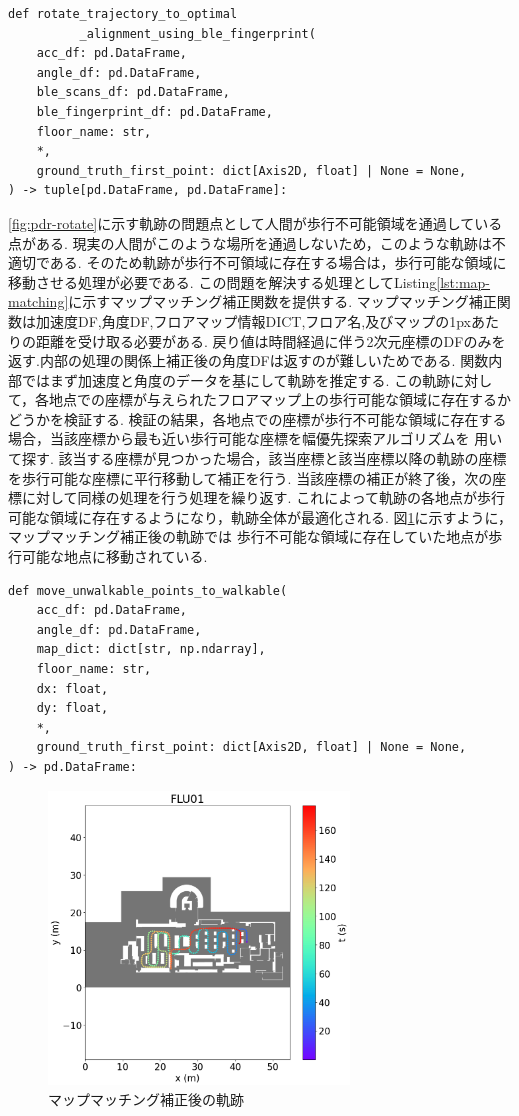 \begin{lstlisting}[caption={BLEビーコンのFPを使用した初期方向補正}, label=lst:rotate-trajectory-using-ble-fingerprint]
def rotate_trajectory_to_optimal
          _alignment_using_ble_fingerprint(
    acc_df: pd.DataFrame,
    angle_df: pd.DataFrame,
    ble_scans_df: pd.DataFrame,
    ble_fingerprint_df: pd.DataFrame,
    floor_name: str,
    *,
    ground_truth_first_point: dict[Axis2D, float] | None = None,
) -> tuple[pd.DataFrame, pd.DataFrame]:
\end{lstlisting}





\ref{fig:pdr-rotate}に示す軌跡の問題点として人間が歩行不可能領域を通過している点がある.
現実の人間がこのような場所を通過しないため，このような軌跡は不適切である.
そのため軌跡が歩行不可領域に存在する場合は，歩行可能な領域に移動させる処理が必要である.
この問題を解決する処理としてListing\ref{lst:map-matching}に示すマップマッチング補正関数を提供する.
マップマッチング補正関数は加速度DF,角度DF,フロアマップ情報DICT,フロア名,及びマップの1pxあたりの距離を受け取る必要がある.
戻り値は時間経過に伴う2次元座標のDFのみを返す.内部の処理の関係上補正後の角度DFは返すのが難しいためである.
関数内部ではまず加速度と角度のデータを基にして軌跡を推定する.
この軌跡に対して，各地点での座標が与えられたフロアマップ上の歩行可能な領域に存在するかどうかを検証する.
検証の結果，各地点での座標が歩行不可能な領域に存在する場合，当該座標から最も近い歩行可能な座標を幅優先探索アルゴリズムを
用いて探す.
該当する座標が見つかった場合，該当座標と該当座標以降の軌跡の座標を歩行可能な座標に平行移動して補正を行う.
当該座標の補正が終了後，次の座標に対して同様の処理を行う処理を繰り返す.
これによって軌跡の各地点が歩行可能な領域に存在するようになり，軌跡全体が最適化される.
図\ref{fig:map-matching}に示すように，マップマッチング補正後の軌跡では
歩行不可能な領域に存在していた地点が歩行可能な地点に移動されている.

\begin{lstlisting}[caption={マップマッチング補正}, label=lst:map-matching]
def move_unwalkable_points_to_walkable(
    acc_df: pd.DataFrame,
    angle_df: pd.DataFrame,
    map_dict: dict[str, np.ndarray],
    floor_name: str,
    dx: float,
    dy: float,
    *,
    ground_truth_first_point: dict[Axis2D, float] | None = None,
) -> pd.DataFrame:

\end{lstlisting}

\begin{figure}[h]
	\centering
	\includegraphics[width=80mm]{image/map-matching.png}
	\caption{マップマッチング補正後の軌跡}    \label{fig:map-matching}
\end{figure}


